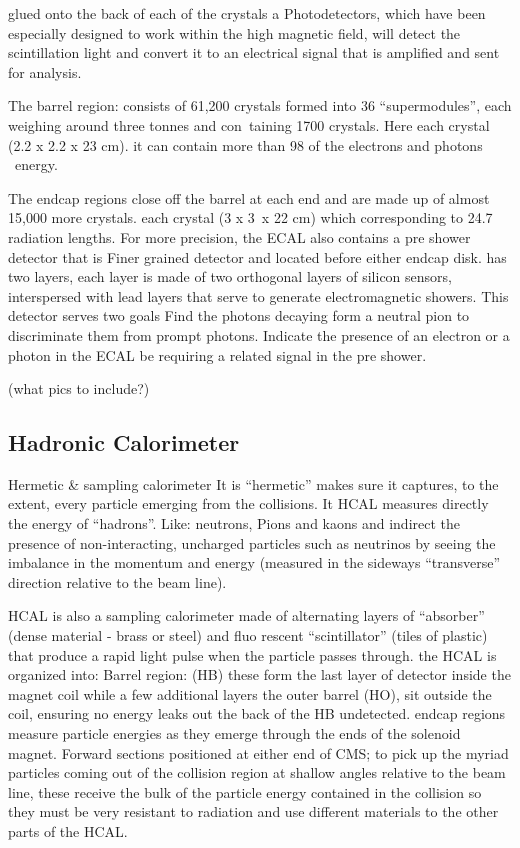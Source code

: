 glued onto the back of each of the crystals a Photodetectors, which have been especially designed to work within the high magnetic field, will detect the scintillation light and convert it to an electrical signal that is amplified and sent for analysis.

The barrel region: consists of 61,200 crystals formed into 36 “supermodules”, each weighing around three tonnes and con\
taining 1700 crystals. Here each crystal (2.2 x 2.2 x 23 cm). it can contain more than 98 of the electrons and photons \
energy.

The endcap regions close off the barrel at each end and are made  up of almost 15,000 more crystals. each crystal (3 x 3\
 x 22 cm) which corresponding to 24.7 radiation lengths. For more precision, the ECAL also contains a pre shower detector that is Finer grained detector and located before either endcap disk.  has two layers, each layer is made of two orthogonal layers of silicon sensors, interspersed with lead layers that serve to generate electromagnetic showers. This detector serves two goals Find the photons decaying form a neutral pion to discriminate them from prompt photons.  Indicate the presence of an electron or a photon in the ECAL be requiring a related signal in the pre shower.


 (what pics to include?)

 \subsection{Hadronic Calorimeter}

 Hermetic & sampling calorimeter
It is “hermetic” makes sure it captures, to the extent, every particle emerging from the collisions. It HCAL measures directly the energy of “hadrons”. Like: neutrons, Pions and kaons and indirect the presence of non-interacting, uncharged particles such as neutrinos by seeing the imbalance in the momentum and energy (measured in the sideways “transverse” direction relative to the beam line).

HCAL is also a sampling calorimeter made of alternating layers of “absorber” (dense material - brass or steel) and fluo rescent “scintillator” (tiles of plastic) that produce a rapid light pulse when the particle passes through.
the HCAL is organized into: Barrel region: (HB) these form the last layer of detector inside the magnet coil while a few additional layers the outer barrel (HO), sit outside the coil, ensuring no energy leaks out the back of the HB undetected. endcap regions measure particle energies as they emerge through the ends of the solenoid magnet. Forward sections  positioned at either end of CMS; to pick up the myriad particles coming out of the collision region at shallow angles relative to the beam line, these receive the bulk of the particle energy contained in the collision so they must be very resistant to radiation and use different materials to the other parts of the HCAL.

